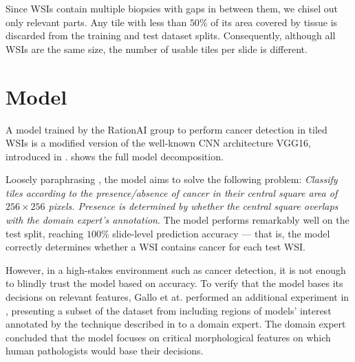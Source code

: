 Since WSIs contain multiple biopsies with gaps in between them, we chisel out only relevant parts.
Any tile with less than $50$\% of its area covered by tissue is discarded from the training and test dataset splits.
Consequently, although all WSIs are the same size, the number of usable tiles per slide is different.

\section{Model}\label{model}

A model trained by the RationAI group to perform cancer detection in tiled WSIs is a modified version of the well-known CNN architecture VGG16, introduced in \cite{vgg16}.
 shows the full model decomposition.

Loosely paraphrasing \cite{gallo}, the model aims to solve the following problem: \emph{Classify tiles according to the presence/absence of cancer in their central square area of $256 \times 256 $ pixels. Presence is determined by whether the central square overlaps with the domain expert's annotation}. The model performs remarkably well on the test split, reaching $100$\% slide-level prediction accuracy --- that is, the model correctly determines whether a WSI contains cancer for each test WSI.

However, in a high-stakes environment such as cancer detection, it is not enough to blindly trust the model based on accuracy.
To verify that the model bases its decisions on relevant features, Gallo et at. performed an additional experiment in \cite{gallo}, presenting a subset of the dataset from  including regions of models' interest annotated by the technique described in  to a domain expert.
The domain expert concluded that the model focuses on critical morphological features \cite{gallo} on which human pathologists would base their decisions.

